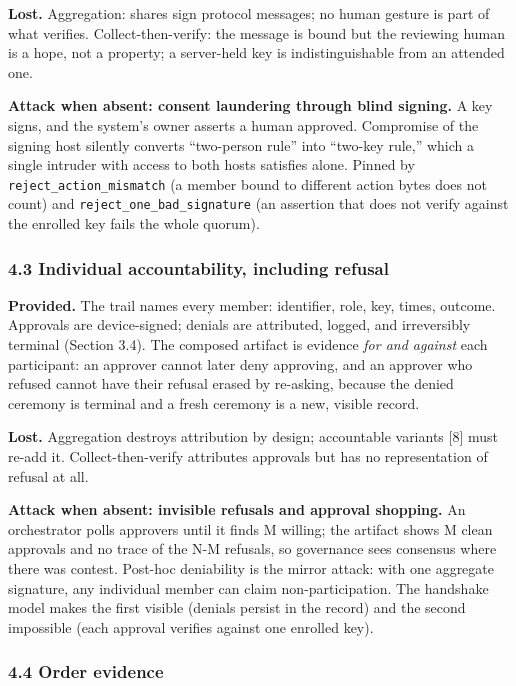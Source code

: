 \documentclass[
  11pt,
]{article}
\begin{document}
\textbf{Lost.} Aggregation: shares sign protocol messages; no human
gesture is part of what verifies. Collect-then-verify: the message is
bound but the reviewing human is a hope, not a property; a server-held
key is indistinguishable from an attended one.

\textbf{Attack when absent: consent laundering through blind signing.} A
key signs, and the system's owner asserts a human approved. Compromise
of the signing host silently converts ``two-person rule'' into
``two-key rule,'' which a single intruder with access to both hosts
satisfies alone. Pinned by \texttt{reject\_action\_mismatch} (a member
bound to different action bytes does not count) and
\texttt{reject\_one\_bad\_signature} (an assertion that does not verify
against the enrolled key fails the whole quorum).

\subsubsection{4.3 Individual accountability, including
refusal}\label{individual-accountability}

\textbf{Provided.} The trail names every member: identifier, role, key,
times, outcome. Approvals are device-signed; denials are attributed,
logged, and irreversibly terminal (Section 3.4). The composed artifact
is evidence \emph{for and against} each participant: an approver cannot
later deny approving, and an approver who refused cannot have their
refusal erased by re-asking, because the denied ceremony is terminal and
a fresh ceremony is a new, visible record.

\textbf{Lost.} Aggregation destroys attribution by design; accountable
variants {[}8{]} must re-add it. Collect-then-verify attributes
approvals but has no representation of refusal at all.

\textbf{Attack when absent: invisible refusals and approval shopping.}
An orchestrator polls approvers until it finds M willing; the artifact
shows M clean approvals and no trace of the N-M refusals, so governance
sees consensus where there was contest. Post-hoc deniability is the
mirror attack: with one aggregate signature, any individual member can
claim non-participation. The handshake model makes the first visible
(denials persist in the record) and the second impossible (each approval
verifies against one enrolled key).

\subsubsection{4.4 Order evidence}\label{order-evidence}
\end{document}
